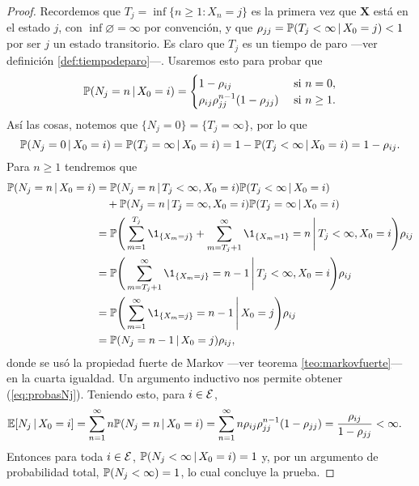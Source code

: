 \begin{proof}
    Recordemos que $T_j = \inf\{n \geq 1 : X_n = j\}$ es la primera vez que $\bm X$ está en el estado $j$, con $\inf \varnothing = \infty$ por convención, y que $\rho_{jj} = \mathbb{P}(T_j < \infty \,\vert\, X_0 = j) < 1$ por ser $j$ un estado transitorio. Es claro que $T_j$ es un tiempo de paro ---ver definición \ref{def:tiempodeparo}---. Usaremos esto para probar que 
    \begin{equation}
        \mathbb{P}(N_j = n \,\vert\, X_0 = i) = \begin{cases}
            1-\rho_{ij} & \text{ si } n = 0, \\
            \rho_{ij} \rho_{jj}^{n-1} (1 - \rho_{jj}) & \text{ si } n \geq 1.
        \end{cases} \label{eq:probasNj}
    \end{equation}
    Así las cosas, notemos que $\{N_j = 0\} = \{T_j = \infty\}$, por lo que 
    \[
        \mathbb{P}(N_j = 0 \,\vert\, X_0 = i) = \mathbb{P}(T_j = \infty \,\vert\, X_0 = i) = 1 - \mathbb{P}(T_j < \infty \,\vert\, X_0 = i) = 1 - \rho_{ij}.
    \]
    Para $n \geq 1$ tendremos que 
    \begin{align*}
        \PP(N_j = n \,\vert\, X_0 = i) & = \PP(N_j = n \,\vert\, T_j < \infty, X_0  = i) \PP(T_j < \infty \,\vert\, X_0 = i) \\
        & \quad + \PP(N_j = n \,\vert\, T_j = \infty, X_0  = i) \PP(T_j = \infty \,\vert\, X_0 = i) \\
        & = \PP \Bigg( \sum_{m = 1}^{T_j} \1_{\{X_m = j\}} + \sum_{m = T_j+1}^\infty \1_{\{X_m = 1\}} = n \,\Bigg\vert\, T_j < \infty, X_0 = i \Bigg) \rho_{ij} \\
        & = \PP\Bigg(\sum_{m = T_j+1}^\infty \1_{\{X_m = j\}} = n - 1 \,\Bigg\vert\, T_j < \infty, X_0 = i \Bigg) \rho_{ij} \\
        & = \PP \Bigg( \sum_{m = 1}^\infty \1_{\{X_m = j\}} = n-1 \,\Bigg\vert\, X_0 = j \Bigg) \rho_{ij} \\
        & = \PP(N_j = n-1 \,\vert\, X_0 = j) \rho_{ij},
    \end{align*}
    donde se usó la propiedad fuerte de Markov ---ver teorema \ref{teo:markovfuerte}--- en la cuarta igualdad. Un argumento inductivo nos permite obtener (\ref{eq:probasNj}). Teniendo esto, para $i \in \mathcal{E}$,
    \begin{align*}
        \mathbb{E}[N_j \,\vert\, X_0 = i] & = \sum_{n = 1}^\infty n \mathbb{P}(N_j = n \,\vert\, X_0 = i) = \sum_{n = 1}^\infty n \rho_{ij} \rho_{jj}^{n-1}(1- \rho_{jj}) = \frac{\rho_{ij}}{1 - \rho_{jj}} < \infty.
    \end{align*}
    Entonces para toda $i \in \mathcal{E}$, $\mathbb{P}(N_j < \infty \,\vert\, X_0 = i) = 1$ y, por un argumento de probabilidad total, $\mathbb{P}(N_j < \infty) = 1$, lo cual concluye la prueba.
\end{proof}

